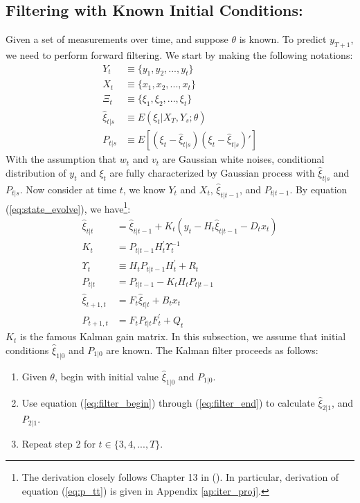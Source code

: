 \documentclass[10pt]{article}
\newenvironment{boenumerate}
    {\begin{enumerate}\renewcommand\labelenumi{\textbf\theenumi}}
    {\end{enumerate}}
\numberwithin{equation}{section}
\begin{document}
\subsection{Filtering with Known Initial Conditions:}
Given a set of measurements over time, and suppose $\theta$ is known. To predict $y_{T+1}$, we need to perform forward filtering. We start by making the following notations:
\begin{align*}
    Y_t &\equiv \{y_1, y_2, ..., y_t\} \\
    X_t &\equiv \{x_1, x_2, ..., x_t\} \\
    \Xi_t &\equiv \{\xi_1,\xi_2,...,\xi_t\} \\
    \hat{\xi}_{t|s} &\equiv E(\xi_t|X_{T},Y_{s};\theta) \\
    P_{t|s} &\equiv E[(\xi_t-\hat{\xi}_{t|s})(\xi_t-\hat{\xi}_{t|s})']
\end{align*}
With the assumption that $w_t$ and $v_t$ are Gaussian white noises, conditional distribution of $y_t$ and $\xi_t$ are fully characterized by Gaussian process with $\hat{\xi}_{t|s}$ and $P_{t|s}$. Now consider at time $t$, we know $Y_t$ and $X_t$, $\hat{\xi}_{t|t-1}$, and $P_{t|t-1}$. By equation (\ref{eq:state_evolve}), we have\footnote{The derivation closely follows Chapter 13 in (\cite{hamilton_1994}). In particular, derivation of equation (\ref{eq:p_tt}) is given in Appendix \ref{ap:iter_proj}.}:
\begin{align}
    \hat{\xi}_{t|t} &= \hat{\xi}_{t|t-1} + K_t(y_t-H_t\hat{\xi}_{t|t-1}-D_tx_t) \label{eq:filter_begin} \\
    K_t &= P_{t|t-1}H_t^{'}\Upsilon_t^{-1} \label{eq:gain} \\
    \Upsilon_t &\equiv H_tP_{t|t-1}H_t^{'} + R_t \\
    P_{t|t} &= P_{t|t-1} - K_tH_tP_{t|t-1} \label{eq:p_tt} \\
    \hat{\xi}_{t+1,t} &= F_t\hat{\xi}_{t|t} + B_tx_t \label{eq:xi_t1} \\
    P_{t+1,t} &= F_tP_{t|t}F_t^{'}+Q_t \label{eq:filter_end}
\end{align}
$K_t$ is the famous Kalman gain matrix. In this subsection, we assume that initial conditions $\hat{\xi}_{1|0}$ and $P_{1|0}$ are known. The Kalman filter proceeds as follows:
\begin{boenumerate}
    \item Given $\theta$, begin with initial value $\hat{\xi}_{1|0}$ and $P_{1|0}$.
    \item Use equation (\ref{eq:filter_begin}) through (\ref{eq:filter_end}) to calculate $\hat{\xi}_{2|1}$, and $P_{2|1}$.
    \item Repeat step 2 for $t\in\{3, 4, ..., T\}$.
\end{boenumerate}
\end{document}
